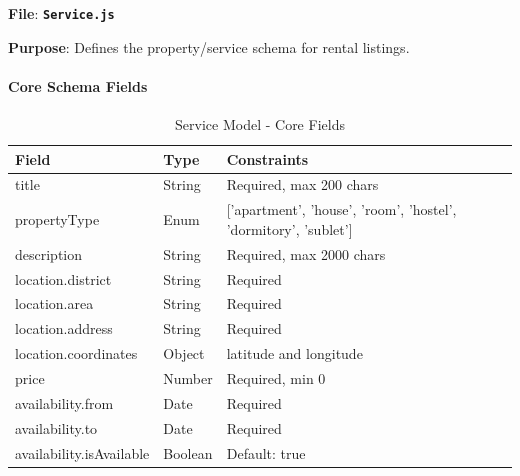 \documentclass[12pt,a4paper]{article}
\newcommand{\file}[1]{\textbf{\texttt{#1}}}
\begin{document}
\textbf{File}: \file{Service.js}

\textbf{Purpose}: Defines the property/service schema for rental listings.

\paragraph{Core Schema Fields}
\begin{table}[H]
\centering
\small
\begin{tabular}{@{}lll@{}}
\toprule
\textbf{Field} & \textbf{Type} & \textbf{Constraints} \\
\midrule
title & String & Required, max 200 chars \\
propertyType & Enum & ['apartment', 'house', 'room', 'hostel', 'dormitory', 'sublet'] \\
description & String & Required, max 2000 chars \\
location.district & String & Required \\
location.area & String & Required \\
location.address & String & Required \\
location.coordinates & Object & latitude and longitude \\
price & Number & Required, min 0 \\
availability.from & Date & Required \\
availability.to & Date & Required \\
availability.isAvailable & Boolean & Default: true \\
\bottomrule
\end{tabular}
\caption{Service Model - Core Fields}
\label{tab:service-core-schema}
\end{table}
\end{document}
